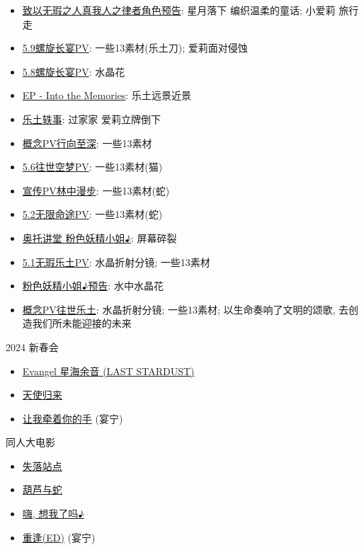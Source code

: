 \documentclass[a4paper]{article}
\begin{document}
\begin{itemize}
    \item \href{https://www.bilibili.com/video/BV1DS4y1t7rs/}{致以无瑕之人真我人之律者角色预告}: 星月落下 编织温柔的童话; 小爱莉 旅行 走
    \item \href{https://www.bilibili.com/video/BV1Ra411X7Hr/}{5.9螺旋长宴PV}: 一些13素材(乐土刀); 爱莉面对侵蚀
    \item \href{https://www.bilibili.com/video/BV1sP4y1F7iQ/}{5.8螺旋长宴PV}: 水晶花
    \item \href{https://www.bilibili.com/video/BV18Y4y1Y7Hc/}{EP - Into the Memories}: 乐土远景近景
    \item \href{https://www.bilibili.com/video/BV1fr4y1n787/}{乐土轶事}: 过家家 爱莉立牌倒下
    \item \href{https://www.bilibili.com/video/BV1wF411b7wo/}{概念PV行向至深}: 一些13素材
    \item \href{https://www.bilibili.com/video/BV1KL4y137Jb/}{5.6往世空梦PV}: 一些13素材(猫)
    \item \href{https://www.bilibili.com/video/BV1F341127NT/}{宣传PV林中漫步}: 一些13素材(蛇)
    \item \href{https://www.bilibili.com/video/BV1V44y1b7cf/}{5.2无限命途PV}: 一些13素材(蛇)
    \item \href{https://www.bilibili.com/video/BV1Ny4y1573D/}{奥托讲堂 粉色妖精小姐♪}: 屏幕碎裂
    \item \href{https://www.bilibili.com/video/BV1iP4y1W7Kk/}{5.1无瑕乐土PV}: 水晶折射分镜; 一些13素材
    \item \href{https://www.bilibili.com/video/BV1Nw411R7bU/}{粉色妖精小姐♪预告}: 水中水晶花
    \item \href{https://www.bilibili.com/video/BV1T64y1X7mY/}{概念PV往世乐土}: 水晶折射分镜; 一些13素材; 以生命奏响了文明的颂歌, 去创造我们所未能迎接的未来
\end{itemize}

2024 新春会

\begin{itemize}
    \item \href{https://www.bilibili.com/video/BV13c411v7DR/}{Evangel 星海余音 (LAST STARDUST)}
    \item \href{https://www.bilibili.com/video/BV1pp4y1m7Uh/}{天使归来}
    \item \href{https://www.bilibili.com/video/BV1te411h7aj/}{让我牵着你的手} (宴宁)
\end{itemize}

同人大电影

\begin{itemize}
    \item \href{https://www.bilibili.com/video/BV1Ud4y1z7mY/?t=309}{失落站点}
    \item \href{https://www.bilibili.com/video/BV1w24y1R7s9/}{葫芦与蛇}
    \item \href{https://www.bilibili.com/video/BV1LD4y117nq/}{嗨, 想我了吗♪}
    \item \href{https://www.bilibili.com/video/BV17D4y117DV/}{重逢(ED)} (宴宁)
\end{itemize}
\end{document}

